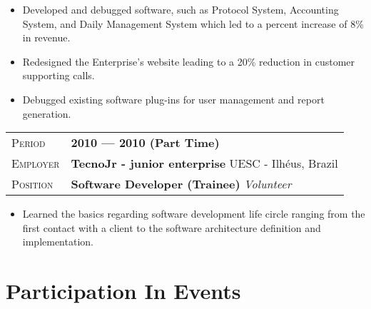 \documentclass[10pt, a4paper, oneside, final]{scrartcl} %
\newcommand{\gray}{\rowcolor[gray]{.90}} %
\begin{document}
\begin{itemize}\itemsep1.5pt
\item Developed and debugged software, such as Protocol System, Accounting System, and Daily Management System which led to a percent increase of 8\% in revenue.

\item Redesigned the Enterprise's website leading to a 20\% reduction in customer supporting calls.

\item Debugged existing software plug-ins for user management and report generation.

\end{itemize}

\begin{center}
\begin{tabularx}{1.0\linewidth}{>{\raggedleft\scshape}p{2.2cm}X}
\gray Period & \textbf{2010 --- 2010 (Part Time)}\\
\gray Employer & \textbf{TecnoJr - junior enterprise} \hfill UESC - Ilhéus, Brazil\\
\gray Position & \textbf{Software Developer (Trainee)} \hfill \textit{Volunteer}\\
\end{tabularx}
\end{center}

\begin{itemize}\itemsep1.5pt
\item Learned the basics regarding software development life circle ranging from the first contact with a client to the software architecture definition and implementation.
\end{itemize}


\section{Participation In Events}
\end{document}
